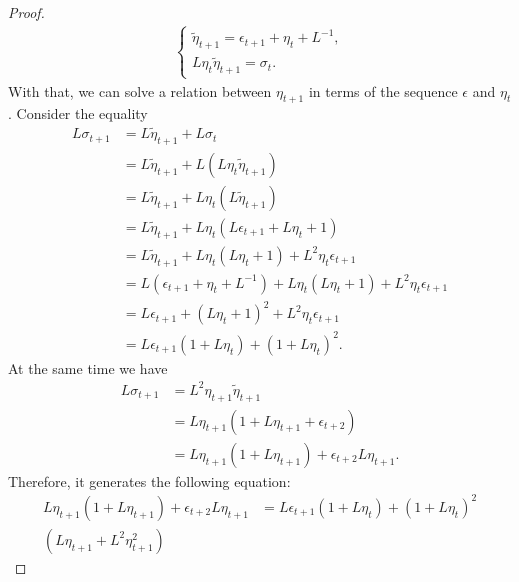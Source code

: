 \documentclass[12pt]{article}
\begin{document}
\begin{proof}
\begin{align*}
            \begin{cases}
                \tilde \eta_{t + 1} = \epsilon_{t + 1} + \eta_t + L^{-1}, 
                \\
                L \eta_t \tilde \eta_{t + 1} = \sigma_t.     
            \end{cases}
        \end{align*}
        With that, we can solve a relation between $\eta_{t + 1}$ in terms of the sequence $\epsilon$ and $\eta_t$.
        Consider the equality 
        \begin{align*}
            L \sigma_{t + 1} &= L \tilde \eta_{t + 1} + L \sigma_t
            \\
            &=
            L \tilde \eta_{t + 1}  + L (L \eta_t \tilde \eta_{t + 1})
            \\
            &= L \tilde \eta_{t+ 1} + L \eta_t (L \tilde \eta_{t + 1})
            \\
            &=  L \tilde \eta_{t+ 1} + L \eta_t (L \epsilon_{t + 1} + L \eta_t + 1)
            \\
            &=  L \tilde \eta_{t+ 1} + L \eta_t (L \eta_t + 1) + L^2 \eta_t \epsilon_{t + 1}
            \\
            &= L (\epsilon_{t +1} + \eta_t + L^{-1}) + L\eta_t(L \eta_t + 1) + L^2\eta_t \epsilon_{t + 1}
            \\
            &= L \epsilon_{t + 1} + (L\eta_t + 1)^2 + L^2\eta_t \epsilon_{t + 1}
            \\
            &= 
            L \epsilon_{t + 1}(1 + L \eta_t) + (1 + L \eta_t)^2. 
        \end{align*}
        At the same time we have 
        \begin{align*}
            L \sigma_{t + 1} &= L^2 \eta_{t + 1}\tilde \eta_{t + 1} 
            \\
            &= L\eta_{t + 1}(1 + L \eta_{t + 1} + \epsilon_{t + 2})
            \\
            &= L\eta_{t + 1}(1 + L \eta_{t + 1}) + \epsilon_{t + 2}L\eta_{t + 1}. 
        \end{align*}
        Therefore, it generates the following equation: 
        \begin{align*}
            L\eta_{t + 1} (1 + L \eta_{t + 1}) 
            + 
            \epsilon_{t + 2} L \eta_{t + 1} 
            &= 
            L\epsilon_{t + 1}(1 + L \eta_t)  + (1 + L\eta_t)^2
            \\
            (L\eta_{t + 1} + L^2\eta_{t + 1}^2)

\end{align*}
\end{proof}
\end{document}
